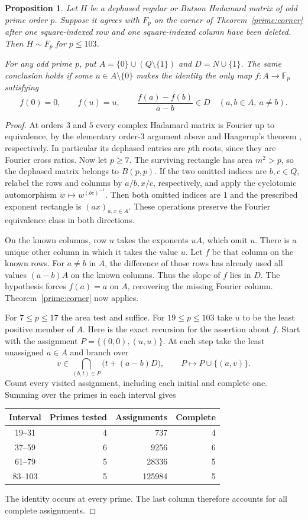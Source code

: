\documentclass[11pt,a4paper]{article}
\newtheorem{proposition}[theorem]{Proposition}
\numberwithin{equation}{section}
\begin{document}
\begin{proposition}\label{prime:two-deletions}
Let $H$ be a dephased regular or Butson Hadamard matrix of odd prime order $p$. Suppose it agrees with $F_p$ on the corner of Theorem~\ref{prime:corner} after one square-indexed row and one square-indexed column have been deleted. Then $H\sim F_p$ for $p\le103$.

For any odd prime $p$, put $A=\{0\}\cup(Q\setminus\{1\})$ and $D=N\cup\{1\}$. The same conclusion holds if some $u\in A\setminus\{0\}$ makes the identity the only map $f:A\to\mathbb F_p$ satisfying
$$f(0)=0,\qquad f(u)=u,\qquad
\frac{f(a)-f(b)}{a-b}\in D\quad(a,b\in A,\ a\ne b).$$
\end{proposition}
\begin{proof}
At orders $3$ and $5$ every complex Hadamard matrix is Fourier up to equivalence, by the elementary order-$3$ argument above and Haagerup's theorem \cite{ha1}, respectively. In particular its dephased entries are $p$th roots, since they are Fourier cross ratios. Now let $p\ge7$. The surviving rectangle has area $m^2>p$, so the dephased matrix belongs to $B(p,p)$. If the two omitted indices are $b,c\in Q$, relabel the rows and columns by $a/b,x/c$, respectively, and apply the cyclotomic automorphism $w\mapsto w^{(bc)^{-1}}$. Then both omitted indices are $1$ and the prescribed exponent rectangle is $(ax)_{a,x\in A}$. These operations preserve the Fourier equivalence class in both directions.

On the known columns, row $u$ takes the exponents $uA$, which omit $u$. There is a unique other column in which it takes the value $u$. Let $f$ be that column on the known rows. For $a\ne b$ in $A$, the difference of those rows has already used all values $(a-b)A$ on the known columns. Thus the slope of $f$ lies in $D$. The hypothesis forces $f(a)=a$ on $A$, recovering the missing Fourier column. Theorem~\ref{prime:corner} now applies.

For $7\le p\le17$ the area test and \cite{hkm} suffice. For $19\le p\le103$ take $u$ to be the least positive member of $A$. Here is the exact recursion for the assertion about $f$. Start with the assignment $P=\{(0,0),(u,u)\}$. At each step take the least unassigned $a\in A$ and branch over
$$v\in\bigcap_{(b,t)\in P}\big(t+(a-b)D\big),\qquad P\longmapsto P\cup\{(a,v)\}.$$
Count every visited assignment, including each initial and complete one. Summing over the primes in each interval gives
\begin{center}
\begin{tabular}{crrr}
\toprule Interval & Primes tested & Assignments & Complete\\\midrule
19--31 & 4 & 737 & 4\\
37--59 & 6 & 9256 & 6\\
61--79 & 5 & 28336 & 5\\
83--103 & 5 & 125984 & 5\\
\bottomrule\end{tabular}
\end{center}
The identity occurs at every prime. The last column therefore accounts for all complete assignments.
\end{proof}
\end{document}

